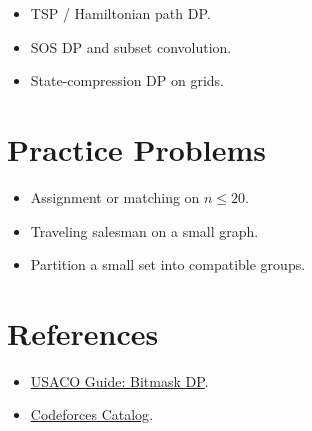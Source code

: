 \begin{itemize}
  \item TSP / Hamiltonian path DP.
  \item SOS DP and subset convolution.
  \item State-compression DP on grids.
\end{itemize}

\section*{Practice Problems}

\begin{itemize}
  \item Assignment or matching on \(n \le 20\).
  \item Traveling salesman on a small graph.
  \item Partition a small set into compatible groups.
\end{itemize}

\section*{References}

\begin{itemize}
  \item \href{https://usaco.guide/gold/dp-bitmasks}{USACO Guide: Bitmask DP}.
  \item \href{https://codeforces.com/catalog}{Codeforces Catalog}.
\end{itemize}

